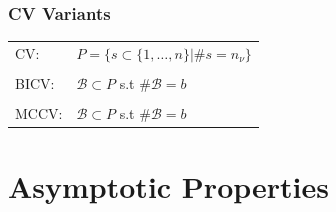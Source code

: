 \documentclass[20pt,mathserif]{beamer}
\begin{document}


\begin{frame}
\frametitle{CV Variants}
\setlength{\tabcolsep}{1pt}
\begin{tabular}{ll}
	CV:& $P=\{s\subset\{1,\ldots,n\}|\#s= n_\nu\}$\\\\
	BICV:& $\mathcal{B}\subset P $ s.t $\# \mathcal{B}=b$\\\\
	MCCV:& $\mathcal{B}\subset P$ s.t $\# \mathcal{B}=b$
\end{tabular}
\end{frame}

\thispagestyle{empty}
\section{Asymptotic Properties}
\end{document}
